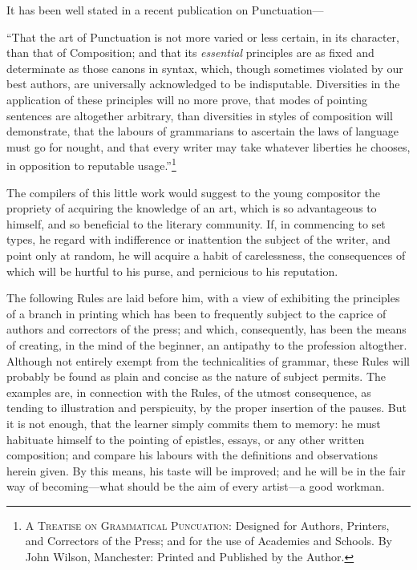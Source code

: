 It has been well stated in a recent publication on Punct\-uation---

\small
``That the art of Punctuation is not more varied or less certain, in its
character, than that of Composition; and that its \emph{essential} principles
are as fixed and determinate as those canons in syntax, which, though sometimes
violated by our best authors, are universally acknowledged to be indisputable.
Diversities in the application of these principles will no more prove, that
modes of pointing sentences are altogether arbitrary, than diversities in
styles of composition will demonstrate, that the labours of grammarians to
ascertain the laws of language must go for nought, and that every writer may
take whatever liberties he chooses, in opposition to reputable
usage.''\footnote{\textsc{A Treatise on Grammatical Puncuation}: Designed for
Authors, Printers, and Correctors of the Press; and for the use of Academies and
Schools. By John Wilson, Manchester: Printed and Published by the Author.}
\normalsize

The compilers of this little work would suggest to the young compositor
the propriety of acquiring the knowledge of an art, which is so advantageous to
himself, and so beneficial to the literary community. If, in commencing to set
types, he regard with indifference or inattention the subject of the writer, and
point only at random, he will acquire a habit of carelessness, the consequences
of which will be hurtful to his purse, and pernicious to his reputation.

The following Rules are laid before him, with a view of exhibiting the
principles of a branch in printing which has been to frequently subject to the
caprice of authors and correctors of the press; and which, consequently, has
been the means of creating, in the mind of the beginner, an antipathy to the
profession altogther. Although not entirely exempt from the technicalities of
grammar, these Rules will probably be found as plain and concise as the nature
of subject permits. The examples are, in connection with the Rules, of the
utmost consequence, as tending to illustration and perspicuity, by the proper
insertion of the pauses. But it is not enough, that the learner simply commits
them to memory: he must habituate himself to the pointing of epistles, essays,
or any other written composition; and compare his labours with the definitions
and observations herein given. By this means, his taste will be improved; and he
will be in the fair way of becoming---what should be the aim of every artist---a
good workman.

